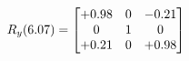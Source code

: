 \documentclass[preview]{standalone}
\begin{document}
\begin{align*}
\special{dvisvgm:raw <g id='unique000'>}R_{y}(6.07) = \begin{bmatrix}+0.98 & 0 & -0.21 \\0 & 1 & 0 \\+0.21 & 0 & +0.98\end{bmatrix}\special{dvisvgm:raw </g>}
\end{align*}
\end{document}
